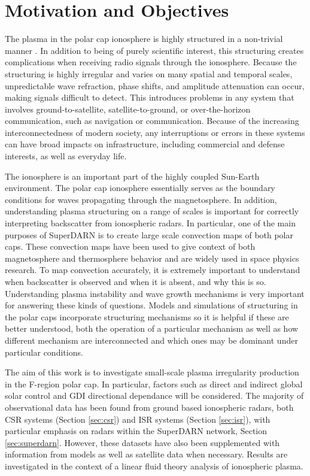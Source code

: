 \section{Motivation and Objectives}

The plasma in the polar cap ionosphere is highly structured in a non-trivial manner \citep{Tsunoda1988,Carlson2012}.  In addition to being of purely scientific interest, this structuring creates complications when receiving radio signals through the ionosphere.  Because the structuring is highly irregular and varies on many spatial and temporal scales, unpredictable wave refraction, phase shifts, and amplitude attenuation can occur, making signals difficult to detect.  This introduces problems in any system that involves ground-to-satellite, satellite-to-ground, or over-the-horizon communication, such as navigation or communication.  Because of the increasing interconnectedness of modern society, any interruptions or errors in these systems can have broad impacts on infrastructure, including commercial and defense interests, as well as everyday life.

The ionosphere is an important part of the highly coupled Sun-Earth environment.  The polar cap ionosphere essentially serves as the boundary conditions for waves propagating through the magnetosphere.  In addition, understanding plasma structuring on a range of scales is important for correctly interpreting backscatter from ionospheric radars.  In particular, one of the main purposes of SuperDARN is to create large scale convection maps of both polar caps.  These convection maps have been used to give context of both magnetosphere and thermosphere behavior and are widely used in space physics research.  To map convection accurately, it is extremely important to understand when backscatter is observed and when it is absent, and why this is so.  Understanding plasma instability and wave growth mechanisms is very important for answering these kinds of questions.  Models and simulations of structuring in the polar caps incorporate structuring mechanisms so it is helpful if these are better understood, both the operation of a particular mechanism as well as how different mechanism are interconnected and which ones may be dominant under particular conditions.

The aim of this work is to investigate small-scale plasma irregularity production in the F-region polar cap.  In particular, factors such as direct and indirect global solar control and GDI directional dependance will be considered.  The majority of observational data has been found from ground based ionospheric radars, both CSR systems (Section \ref{sec:csr}) and ISR systems (Section \ref{sec:isr}), with particular emphasis on radars within the SuperDARN network, Section \ref{sec:superdarn}.  However, these datasets have also been supplemented with information from models as well as satellite data when necessary.  Results are investigated in the context of a linear fluid theory analysis of ionospheric plasma.

